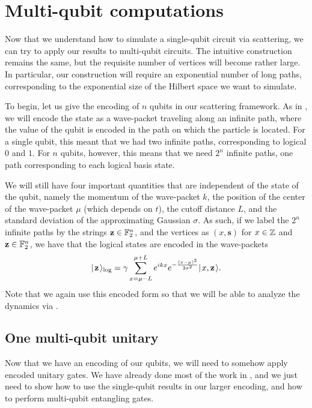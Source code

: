 \documentclass[../thesis-main/thesis-main]{subfiles}
\begin{document}
\section{Multi-qubit computations}
\label{sec:SP_multi_qubit_computations}

Now that we understand how to simulate a single-qubit circuit via scattering, we can try to apply our results to multi-qubit circuits.  The intuitive construction remains the same, but the requisite number of vertices will become rather large.  In particular, our construction will require an exponential number of long paths, corresponding to the exponential size of the Hilbert space we want to simulate.

To begin, let us give the encoding of $n$ qubits in our scattering framework.  As in , we will encode the state as a wave-packet traveling along an infinite path, where the value of the qubit is encoded in the path on which the particle is located.  For a single qubit, this meant that we had two infinite paths, corresponding to logical $0$ and $1$.  For $n$ qubits, however, this means that we need $2^n$ infinite paths, one path corresponding to each logical basis state.

We will still have four important quantities that are independent of the state of the qubit, namely the momentum of the wave-packet $k$, the position of the center of the wave-packet $\mu$ (which depends on $t$), the cutoff distance $L$, and the standard deviation of the approximating Gaussian $\sigma$.  As such, if we label the $2^n$ infinite paths by the strings $\mathbf{z}\in \mathbb{F}_2^n$, and the vertices as $(x,\mathbf{s})$ for $x\in \mathbb{Z}$ and $\mathbf{z}\in \mathbb{F}_2^n$, we have that the logical states are encoded in the wave-packets
\begin{align}
  |\mspace{2mu} \mathbf{z} \mspace{2mu} \rangle_{\text{log}} = \gamma \sum_{x = \mu - L}^{\mu + L} e^{ i k x} e^{ - \frac{(x-\mu)^2}{2\sigma^2}} |\mspace{2mu} x,\mathbf{z} \mspace{2mu} \rangle \label{eq:multi_qubit_encoding}.
\end{align}
Note that we again use this encoded form so that we will be able to analyze the dynamics via .


\subsection{One multi-qubit unitary}\label{sec:multi_qubit_single_gate}

Now that we have an encoding of our qubits, we will need to somehow apply encoded unitary gates.  We have already done most of the work in , and we just need to show how to use the single-qubit results in our larger encoding, and how to perform multi-qubit entangling gates.
\end{document}
